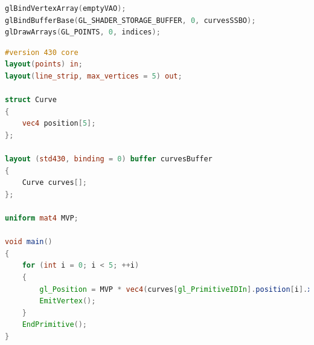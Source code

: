 \documentclass[]{acmsiggraph}
\begin{document}
\begin{lstlisting}[language=C++, label={lst:rendercpp}, caption={Extract from the C++ application code showing how Curves are rendered procedurally. \texttt{emptyVAO} is an empty Vertex Array Object, \texttt{curvesSSBO} is a \texttt{GL\_SHADER\_STORAGE\_BUFFER} containing vertex data for multiple curves, and \texttt{indices} is the number of curves in the buffer.}]
glBindVertexArray(emptyVAO);
glBindBufferBase(GL_SHADER_STORAGE_BUFFER, 0, curvesSSBO);
glDrawArrays(GL_POINTS, 0, indices);
\end{lstlisting}

\begin{lstlisting}[language=GLSL, label={lst:renderglsl}, caption={Extract from the curves rendering geometry shader, showing how vertex positions were processed from data stored in a bound \texttt{GL\_SHADER\_STORAGE\_BUFFER}.}]
#version 430 core
layout(points) in;
layout(line_strip, max_vertices = 5) out;

struct Curve
{
	vec4 position[5];
};

layout (std430, binding = 0) buffer curvesBuffer
{
	Curve curves[];
};

uniform mat4 MVP;

void main()
{
	for (int i = 0; i < 5; ++i)
	{
		gl_Position = MVP * vec4(curves[gl_PrimitiveIDIn].position[i].xyz, 1.0);
		EmitVertex();
	}
	EndPrimitive();
}
\end{lstlisting}
\end{document}
